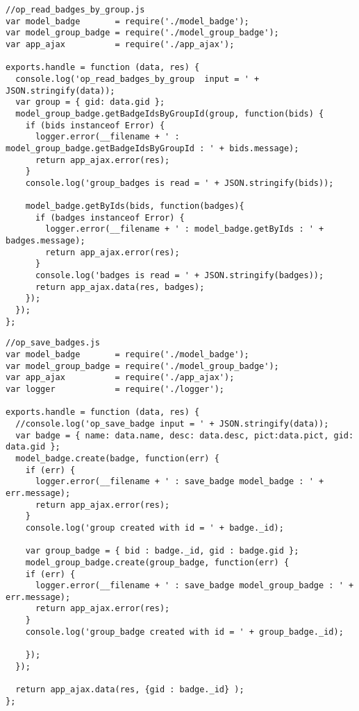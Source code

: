 
\small
\lstset{basicstyle=\ttfamily,breaklines=true}
\begin{lstlisting}
//op_read_badges_by_group.js
var model_badge       = require('./model_badge');
var model_group_badge = require('./model_group_badge');
var app_ajax          = require('./app_ajax');

exports.handle = function (data, res) {
  console.log('op_read_badges_by_group  input = ' + JSON.stringify(data));
  var group = { gid: data.gid };
  model_group_badge.getBadgeIdsByGroupId(group, function(bids) {
    if (bids instanceof Error) {
      logger.error(__filename + ' : model_group_badge.getBadgeIdsByGroupId : ' + bids.message);
      return app_ajax.error(res);
    }
    console.log('group_badges is read = ' + JSON.stringify(bids));
    
    model_badge.getByIds(bids, function(badges){
      if (badges instanceof Error) {
        logger.error(__filename + ' : model_badge.getByIds : ' + badges.message);
        return app_ajax.error(res);
      }
      console.log('badges is read = ' + JSON.stringify(badges));
      return app_ajax.data(res, badges);
    });
  });
};
\end{lstlisting}


\begin{lstlisting}
//op_save_badges.js
var model_badge       = require('./model_badge');
var model_group_badge = require('./model_group_badge');
var app_ajax          = require('./app_ajax');
var logger            = require('./logger');

exports.handle = function (data, res) {
  //console.log('op_save_badge input = ' + JSON.stringify(data));
  var badge = { name: data.name, desc: data.desc, pict:data.pict, gid: data.gid };
  model_badge.create(badge, function(err) {
    if (err) {
      logger.error(__filename + ' : save_badge model_badge : ' + err.message);
      return app_ajax.error(res);
    }
    console.log('group created with id = ' + badge._id);
    
    var group_badge = { bid : badge._id, gid : badge.gid };
    model_group_badge.create(group_badge, function(err) {
    if (err) {
      logger.error(__filename + ' : save_badge model_group_badge : ' + err.message);
      return app_ajax.error(res);
    }
    console.log('group_badge created with id = ' + group_badge._id);
    
    });
  });
  
  return app_ajax.data(res, {gid : badge._id} );  
};
\end{lstlisting}


